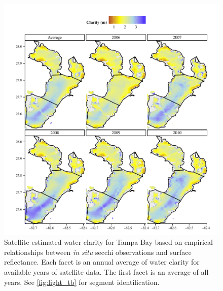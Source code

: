 \documentclass[letterpaper,12pt,oneside]{article}\usepackage[]{graphicx}\usepackage[]{color}
\begin{document}
\begin{figure}
\centering
\includegraphics[width = \textwidth]{figs/clarity_tb.pdf}
\caption{Satellite estimated water clarity for Tampa Bay based on empirical relationships between \textit{in situ} secchi observations and surface reflectance.  Each facet is an annual average of water clarity for available years of satellite data. The first facet is an average of all years.  See \cref{fig:light_tb} for segment identification.}
\label{fig:clarity_tb}
\end{figure}

\end{document}
